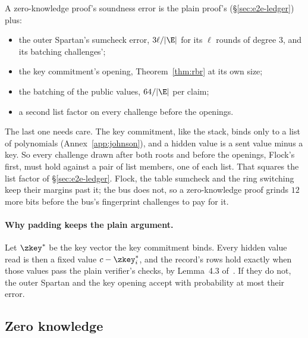 A zero-knowledge proof's soundness error is the plain proof's (\S\ref{sec:e2e-ledger}) plus:
\begin{itemize}[itemsep=1pt,topsep=2pt]
\item the outer Spartan's sumcheck error, $3 \ell / |\E|$ for its $\ell$ rounds of degree $3$, and its batching challenges';
\item the key commitment's opening, Theorem~\ref{thm:rbr} at its own size;
\item the batching of the public values, $64 / |\E|$ per claim;
\item a second list factor on every challenge before the openings.
\end{itemize}
The last one needs care. The key commitment, like the stack, binds only to a list of polynomials (Annex~\ref{app:johnson}), and a hidden value is a sent value minus a key. So every challenge drawn after both roots and before the openings, Flock's first, must hold against a pair of list members, one of each list. That squares the list factor of \S\ref{sec:e2e-ledger}. Flock, the table sumcheck and the ring switching keep their margins past it; the bus does not, so a zero-knowledge proof grinds $12$ more bits before the bus's fingerprint challenges to pay for it.

\paragraph{Why padding keeps the plain argument.} Let $\zkey^\ast$ be the key vector the key commitment binds. Every hidden value read is then a fixed value $c - \zkey_i^\ast$, and the record's rows hold exactly when those values pass the plain verifier's checks, by Lemma~4.3 of~\cite{DHRR26}. If they do not, the outer Spartan and the key opening accept with probability at most their error.

\subsection{Zero knowledge}\label{zk:zk}

